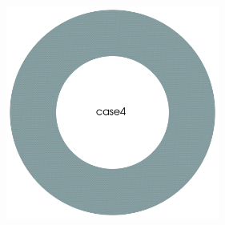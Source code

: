 \documentclass[12pt]{article}
\numberwithin{equation}{subsection}
\begin{document}
\begin{figure}[!htb]
\begin{multicols}{4}
		\hspace{2.25in}
		\includegraphics[width=7cm]{./case4/mesh.png}
	\end{multicols}
	
\end{figure}
\end{document}
